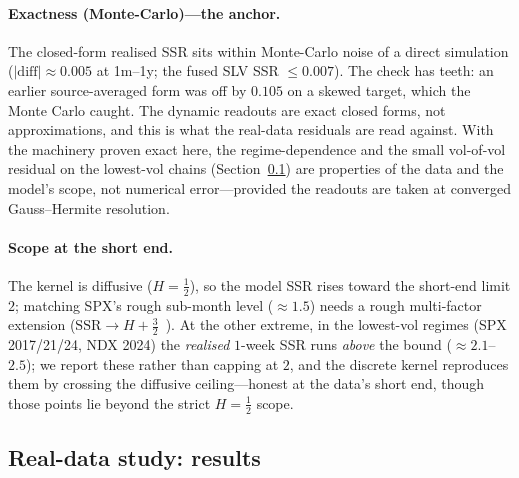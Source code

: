 \documentclass[11pt]{article}
\newcommand{\SSR}{\mathrm{SSR}}
\begin{document}
\paragraph{Exactness (Monte-Carlo)---the anchor.} The closed-form realised SSR sits within Monte-Carlo noise of a direct simulation
($|\mathrm{diff}|\approx0.005$ at 1m--1y; the fused SLV SSR $\le0.007$). The check has teeth: an
earlier source-averaged form was off by $0.105$ on a skewed target, which the Monte Carlo caught. The dynamic readouts are exact closed forms, not approximations, and this is what the
real-data residuals are read against. With the machinery proven exact here, the regime-dependence and
the small vol-of-vol residual on the lowest-vol chains (Section~\ref{sec:realdata}) are properties of the data and the model's
scope, not numerical error---provided the readouts are taken at converged Gauss--Hermite resolution.

\paragraph{Scope at the short end.} The kernel is diffusive ($H{=}\tfrac12$), so the model SSR rises
toward the short-end limit $2$; matching SPX's rough sub-month level (${\approx}1.5$) needs a rough
multi-factor extension ($\SSR\to H+\tfrac32$~\cite{fukasawa2026}). At the other extreme, in the lowest-vol
regimes (SPX 2017/21/24, NDX 2024) the \emph{realised} $1$-week SSR runs \emph{above} the bound
(${\approx}2.1$--$2.5$); we report these rather than capping at $2$, and the discrete kernel reproduces them by
crossing the diffusive ceiling---honest at the data's short end, though those points lie beyond the strict
$H{=}\tfrac12$ scope.

\subsection{Real-data study: results}
\label{sec:realdata}
\end{document}
